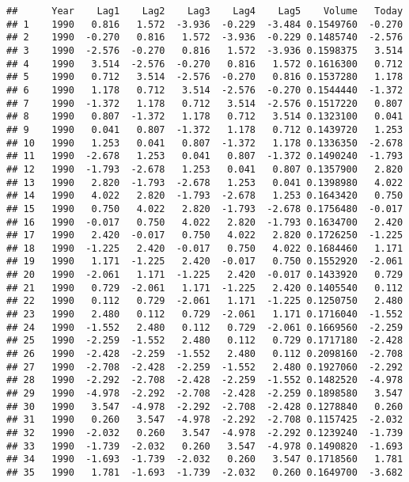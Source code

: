 \documentclass[]{article}
\begin{document}
\begin{verbatim}
##      Year    Lag1    Lag2    Lag3    Lag4    Lag5    Volume   Today
## 1    1990   0.816   1.572  -3.936  -0.229  -3.484 0.1549760  -0.270
## 2    1990  -0.270   0.816   1.572  -3.936  -0.229 0.1485740  -2.576
## 3    1990  -2.576  -0.270   0.816   1.572  -3.936 0.1598375   3.514
## 4    1990   3.514  -2.576  -0.270   0.816   1.572 0.1616300   0.712
## 5    1990   0.712   3.514  -2.576  -0.270   0.816 0.1537280   1.178
## 6    1990   1.178   0.712   3.514  -2.576  -0.270 0.1544440  -1.372
## 7    1990  -1.372   1.178   0.712   3.514  -2.576 0.1517220   0.807
## 8    1990   0.807  -1.372   1.178   0.712   3.514 0.1323100   0.041
## 9    1990   0.041   0.807  -1.372   1.178   0.712 0.1439720   1.253
## 10   1990   1.253   0.041   0.807  -1.372   1.178 0.1336350  -2.678
## 11   1990  -2.678   1.253   0.041   0.807  -1.372 0.1490240  -1.793
## 12   1990  -1.793  -2.678   1.253   0.041   0.807 0.1357900   2.820
## 13   1990   2.820  -1.793  -2.678   1.253   0.041 0.1398980   4.022
## 14   1990   4.022   2.820  -1.793  -2.678   1.253 0.1643420   0.750
## 15   1990   0.750   4.022   2.820  -1.793  -2.678 0.1756480  -0.017
## 16   1990  -0.017   0.750   4.022   2.820  -1.793 0.1634700   2.420
## 17   1990   2.420  -0.017   0.750   4.022   2.820 0.1726250  -1.225
## 18   1990  -1.225   2.420  -0.017   0.750   4.022 0.1684460   1.171
## 19   1990   1.171  -1.225   2.420  -0.017   0.750 0.1552920  -2.061
## 20   1990  -2.061   1.171  -1.225   2.420  -0.017 0.1433920   0.729
## 21   1990   0.729  -2.061   1.171  -1.225   2.420 0.1405540   0.112
## 22   1990   0.112   0.729  -2.061   1.171  -1.225 0.1250750   2.480
## 23   1990   2.480   0.112   0.729  -2.061   1.171 0.1716040  -1.552
## 24   1990  -1.552   2.480   0.112   0.729  -2.061 0.1669560  -2.259
## 25   1990  -2.259  -1.552   2.480   0.112   0.729 0.1717180  -2.428
## 26   1990  -2.428  -2.259  -1.552   2.480   0.112 0.2098160  -2.708
## 27   1990  -2.708  -2.428  -2.259  -1.552   2.480 0.1927060  -2.292
## 28   1990  -2.292  -2.708  -2.428  -2.259  -1.552 0.1482520  -4.978
## 29   1990  -4.978  -2.292  -2.708  -2.428  -2.259 0.1898580   3.547
## 30   1990   3.547  -4.978  -2.292  -2.708  -2.428 0.1278840   0.260
## 31   1990   0.260   3.547  -4.978  -2.292  -2.708 0.1157425  -2.032
## 32   1990  -2.032   0.260   3.547  -4.978  -2.292 0.1239240  -1.739
## 33   1990  -1.739  -2.032   0.260   3.547  -4.978 0.1490820  -1.693
## 34   1990  -1.693  -1.739  -2.032   0.260   3.547 0.1718560   1.781
## 35   1990   1.781  -1.693  -1.739  -2.032   0.260 0.1649700  -3.682

\end{verbatim}
\end{document}
